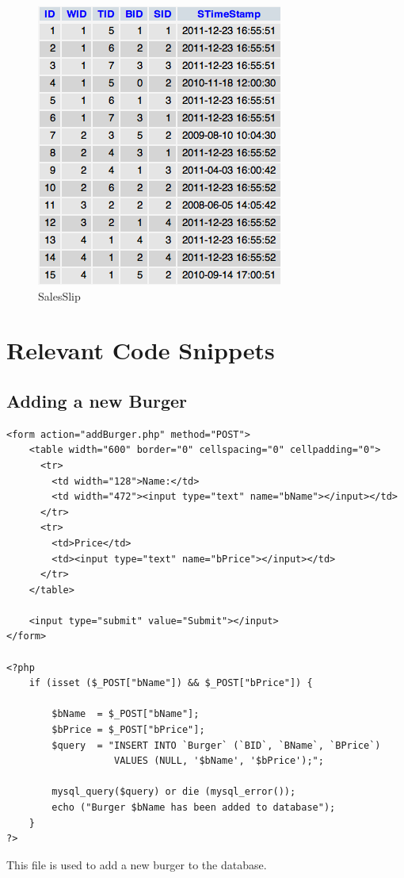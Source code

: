 \documentclass[10pt, a4paper]{article}
\begin{document}
\begin{figure}[htb]
	\centering
	\includegraphics[scale=0.9]{fig/salesslip.png}
	\caption{SalesSlip}
\end{figure}

\pagebreak
\section{Relevant Code Snippets}
\subsection{Adding a new Burger}

\begin{lstlisting}[caption=addBurger.php]
<form action="addBurger.php" method="POST">
    <table width="600" border="0" cellspacing="0" cellpadding="0">
      <tr>
        <td width="128">Name:</td>
        <td width="472"><input type="text" name="bName"></input></td>
      </tr>
      <tr>
        <td>Price</td>
        <td><input type="text" name="bPrice"></input></td>
      </tr>
    </table>
    
    <input type="submit" value="Submit"></input>
</form>

<?php
    if (isset ($_POST["bName"]) && $_POST["bPrice"]) {
        
        $bName  = $_POST["bName"];
        $bPrice = $_POST["bPrice"];
        $query  = "INSERT INTO `Burger` (`BID`, `BName`, `BPrice`)
                   VALUES (NULL, '$bName', '$bPrice');";
        
        mysql_query($query) or die (mysql_error());
        echo ("Burger $bName has been added to database");
    }
?>
\end{lstlisting}
This file is used to add a new burger to the database.
\end{document}
